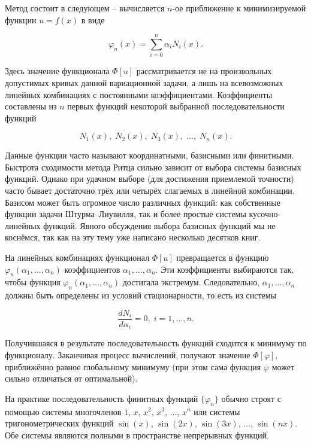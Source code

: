 Метод состоит в следующем -- вычисляется $n$-ое приближение к минимизируемой функции $u = f(x)$ в виде

\begin{equation}\label{approx_func}
	\varphi_{n}(x) = \sum_{i=0}^n \alpha_{i} N_{i}(x).
\end{equation}

\noindent Здесь значение функционала $\Phi[u]$ рассматривается не на произвольных допустимых кривых данной вариационной задачи, а лишь на всевозможных линейных комбинациях с постоянными коэффициентами. Коэффициенты составлены из $n$ первых функций некоторой выбранной последовательности функций

\begin{displaymath}
	N_{1}(x), \; N_{2}(x), \; N_{3}(x), \; \ldots, \; N_{n}(x).
\end{displaymath}

\begin{info}
	Данные функции часто называют координатными, базисными или финитными. Быстрота сходимости метода Ритца сильно зависит от выбора системы базисных функций. Однако при удачном выборе (для достижения приемлемой точности) часто бывает достаточно трёх или четырёх слагаемых в линейной комбинации. Базисом может быть огромное число различных функций: как собственные функции задачи Штурма--Лиувилля, так и более простые системы кусочно-линейных функций. Явного обсуждения выбора базисных функций мы не коснёмся, так как на эту тему уже написано несколько десятков книг.
\end{info}

На линейных комбинациях функционал $\Phi[u]$ превращается в функцию $\varphi_{n}(\alpha_{1}, \ldots, \alpha_{n})$ коэффициентов $\alpha_{1}, \ldots, \alpha_{n}$. Эти коэффициенты выбираются так, чтобы функция $\varphi_{n}(\alpha_{1}, \ldots, \alpha_{n})$ достигала экстремум. Следовательно, $\alpha_{1}, \ldots, \alpha_{n}$ должны быть определены из условий стационарности, то есть из системы

\begin{displaymath}
	\frac{d N_{i}}{d\alpha_{i}} = 0, \; i = 1, \ldots, n.
\end{displaymath}

Получившаяся в результате последовательность функций сходится к минимуму по функционалу. Заканчивая процесс вычислений, получают значение $\Phi[\varphi]$, приближённо равное глобальному минимуму (при этом сама функция $\varphi$ может сильно отличаться от оптимальной).

На практике последовательность финитных функций ${\lbrace \varphi_{n} \rbrace}$ обычно строят с помощью системы многочленов $1$, $x$, $x^2$, $x^3$, $\ldots$, $x^n$ или системы тригонометрических функций $\sin (x)$, $\sin (2x)$, $\sin (3x)$, $\ldots$, $\sin (nx)$. Обе системы являются полными в пространстве непрерывных функций.

